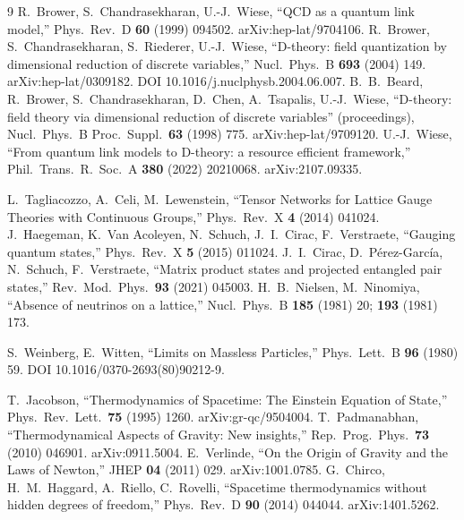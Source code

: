 \documentclass[12pt,a4paper,twoside]{article}
\theoremstyle{plain}
\theoremstyle{definition}
\theoremstyle{remark}
\begin{document}
\begin{thebibliography}{9}
R.~Brower, S.~Chandrasekharan, U.-J.~Wiese, ``QCD as a quantum link model,'' Phys.\ Rev.\ D \textbf{60} (1999) 094502. arXiv:hep-lat/9704106.
R.~Brower, S.~Chandrasekharan, S.~Riederer, U.-J.~Wiese, ``D-theory: field quantization by dimensional reduction of discrete variables,'' Nucl.\ Phys.\ B \textbf{693} (2004) 149. arXiv:hep-lat/0309182. DOI 10.1016/j.nuclphysb.2004.06.007.
B.~B.~Beard, R.~Brower, S.~Chandrasekharan, D.~Chen, A.~Tsapalis, U.-J.~Wiese, ``D-theory: field theory via dimensional reduction of discrete variables'' (proceedings), Nucl.\ Phys.\ B Proc.\ Suppl.\ \textbf{63} (1998) 775. arXiv:hep-lat/9709120.
U.-J.~Wiese, ``From quantum link models to D-theory: a resource efficient framework,'' Phil.\ Trans.\ R.\ Soc.\ A \textbf{380} (2022) 20210068. arXiv:2107.09335.

L.~Tagliacozzo, A.~Celi, M.~Lewenstein, ``Tensor Networks for Lattice Gauge Theories with Continuous Groups,'' Phys.\ Rev.\ X \textbf{4} (2014) 041024.
J.~Haegeman, K.~Van Acoleyen, N.~Schuch, J.~I.~Cirac, F.~Verstraete, ``Gauging quantum states,'' Phys.\ Rev.\ X \textbf{5} (2015) 011024.
J.~I.~Cirac, D.~P\'erez-Garc\'ia, N.~Schuch, F.~Verstraete, ``Matrix product states and projected entangled pair states,'' Rev.\ Mod.\ Phys.\ \textbf{93} (2021) 045003.
H.~B.~Nielsen, M.~Ninomiya, ``Absence of neutrinos on a lattice,'' Nucl.\ Phys.\ B \textbf{185} (1981) 20; \textbf{193} (1981) 173.

S.~Weinberg, E.~Witten, ``Limits on Massless Particles,'' Phys.\ Lett.\ B \textbf{96} (1980) 59. DOI 10.1016/0370-2693(80)90212-9.

T.~Jacobson, ``Thermodynamics of Spacetime: The Einstein Equation of State,'' Phys.\ Rev.\ Lett.\ \textbf{75} (1995) 1260. arXiv:gr-qc/9504004.
T.~Padmanabhan, ``Thermodynamical Aspects of Gravity: New insights,'' Rep.\ Prog.\ Phys.\ \textbf{73} (2010) 046901. arXiv:0911.5004.
E.~Verlinde, ``On the Origin of Gravity and the Laws of Newton,'' JHEP \textbf{04} (2011) 029. arXiv:1001.0785.
G.~Chirco, H.~M.~Haggard, A.~Riello, C.~Rovelli, ``Spacetime thermodynamics without hidden degrees of freedom,'' Phys.\ Rev.\ D \textbf{90} (2014) 044044. arXiv:1401.5262.


\end{thebibliography}
\end{document}
